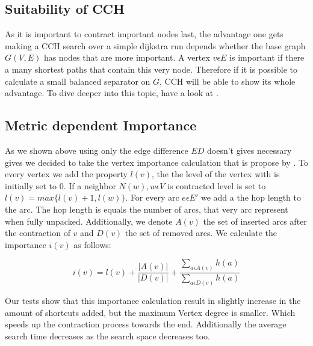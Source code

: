 \subsection{Suitability of CCH}

As it is important to contract important nodes last, the advantage one gets making a CCH search over a simple dijkstra run depends whether the base graph $G(V, E)$ has nodes that are more important. 
A vertex $v \epsilon E$ is important if there a many shortest paths that contain this very node. Therefore if it is possible to calculate a small balanced separator on $G$, CCH will be able to show its 
whole advantage. To dive deeper into this topic, have a look at \cite[Lower Bounds and Approximation Algorithms for Search Space Sizes in Contraction Hierarchies]{BlumStorandt}.

\subsection{Metric dependent Importance}

As we shown above using only the edge difference $ED$ doesn't gives necessary gives we decided to take the vertex importance calculation that is propose by \cite[Customization Contraction Hierarchies]{CCH}. To every 
vertex we add the property $l(v)$, the the level of the vertex with is initially set to $0$. If a neighbor $N(w),  w \epsilon V$ is contracted level is set to $l(v) = max\{l(v)+1, l(w)\}$. For every arc $e \epsilon E'$
we add a the hop length to the arc. The hop length is equals the number of arcs, that very arc represent when fully unpacked. Additionally, we denote $A(v)$ the set of inserted arcs after the contraction
of $v$ and $D(v)$ the set of removed arcs. We calculate the importance $i(v)$ as follows:

\begin{equation*}
    i(v) = l(v) + \frac{|A(v)|}{|D(v)|} + \frac{\sum_{a \epsilon A(v)} h(a)}{\sum_{a \epsilon D(v)} h(a)} 
\end{equation*}

Our tests show that this importance calculation result in slightly increase in the amount of shortcuts added, but the maximum Vertex degree is smaller. Which speeds up the contraction process towards the end. Additionally
the average search time decreases as the search space decreases too. 

% 

